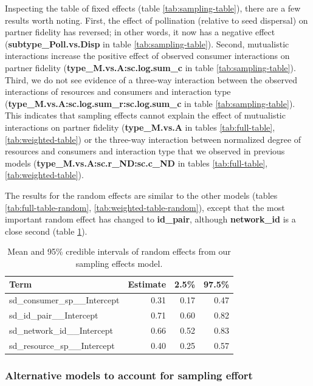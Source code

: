 \documentclass[11pt,]{article}
\begin{document}
Inspecting the table of fixed effects (table \ref{tab:sampling-table}),
there are a few results worth noting. First, the effect of pollination
(relative to seed dispersal) on partner fidelity has reversed; in other
words, it now has a negative effect (\textbf{subtype\_Poll.vs.Disp} in
table \ref{tab:sampling-table}). Second, mutualistic interactions
increase the positive effect of observed consumer interactions on
partner fidelity (\textbf{type\_M.vs.A:sc.log.sum\_c} in table
\ref{tab:sampling-table}). Third, we do not see evidence of a three-way
interaction between the observed interactions of resources and consumers
and interaction type (\textbf{type\_M.vs.A:sc.log.sum\_r:sc.log.sum\_c}
in table \ref{tab:sampling-table}). This indicates that sampling effects
cannot explain the effect of mutualistic interactions on partner
fidelity (\textbf{type\_M.vs.A} in tables \ref{tab:full-table},
\ref{tab:weighted-table}) or the three-way interaction between
normalized degree of resources and consumers and interaction type that
we observed in previous models (\textbf{type\_M.vs.A:sc.r\_ND:sc.c\_ND}
in tables \ref{tab:full-table}, \ref{tab:weighted-table}).

The results for the random effects are similar to the other models
(tables \ref{tab:full-table-random}, \ref{tab:weighted-table-random}),
except that the most important random effect has changed to
\textbf{id\_pair}, although \textbf{network\_id} is a close second
(table \ref{tab:sampling-table-random}).

\begin{table}[!h]

\caption{\label{tab:sampling-table-random}Mean and 95\% credible intervals of random effects from our sampling effects model.}
\centering
\begin{tabular}{lrrr}
\toprule
Term & Estimate & 2.5\% & 97.5\%\\
\midrule
\rowcolor{gray!6}  sd\_consumer\_sp\_\_Intercept & 0.31 & 0.17 & 0.47\\
sd\_id\_pair\_\_Intercept & 0.71 & 0.60 & 0.82\\
\rowcolor{gray!6}  sd\_network\_id\_\_Intercept & 0.66 & 0.52 & 0.83\\
sd\_resource\_sp\_\_Intercept & 0.40 & 0.25 & 0.57\\
\bottomrule
\end{tabular}
\end{table}

\subsubsection{Alternative models to account for sampling
effort}\label{alternative-models-to-account-for-sampling-effort}
\end{document}
